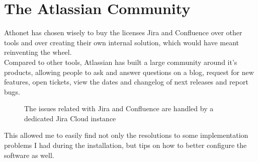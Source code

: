 \section{The Atlassian Community}\label{sec:atlassian_community}
	Athonet has chosen wisely to buy the licenses Jira and Confluence over other tools and over creating their own internal solution, which would have meant reinventing the wheel.\\
	Compared to other tools, Atlassian has built a large community around it's products, allowing people to ask and answer questions on a blog, request for new features, open tickets, view the dates and changelog of next releases and report bugs.
	\begin{figure}[H]
		\centering
		\caption{The issues related with Jira and Confluence are handled by a dedicated Jira Cloud instance}
	\end{figure}
	This allowed me to easily find not only the resolutions to some implementation problems I had during the installation, but tips on how to better configure the software as well.

